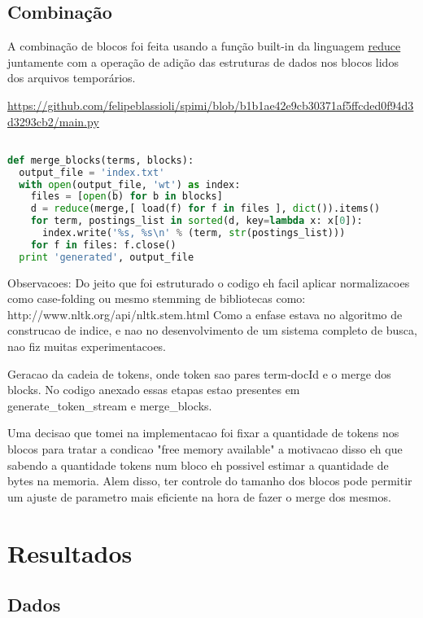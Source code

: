 \documentclass[a4paper]{article}
\begin{document}
\subsection{Combinação}

A combinação de blocos foi feita usando a função built-in da linguagem \href{https://docs.python.org/2/library/functions.html#reduce}{reduce} juntamente com a operação de adição das estruturas de dados nos blocos lidos dos arquivos temporários.

\url{https://github.com/felipeblassioli/spimi/blob/b1b1ae42e9cb30371af5ffcded0f94d3d3293cb2/main.py}
\begin{lstlisting}[language=Python]  % Start your code-block

def merge_blocks(terms, blocks):
  output_file = 'index.txt'
  with open(output_file, 'wt') as index:
    files = [open(b) for b in blocks]
    d = reduce(merge,[ load(f) for f in files ], dict()).items()
    for term, postings_list in sorted(d, key=lambda x: x[0]):
      index.write('%s, %s\n' % (term, str(postings_list)))
    for f in files: f.close()
  print 'generated', output_file
\end{lstlisting}

Observacoes:
Do jeito que foi estruturado o codigo eh facil aplicar normalizacoes como case-folding ou mesmo stemming de bibliotecas como: http://www.nltk.org/api/nltk.stem.html
Como a enfase estava no algoritmo de construcao de indice, e nao no desenvolvimento de um sistema completo de busca, nao fiz muitas experimentacoes.

Geracao da cadeia de tokens, onde token sao pares term-docId e o merge dos blocks. No codigo anexado 
essas etapas estao presentes em generate_token_stream e merge_blocks.

Uma decisao que tomei na implementacao foi fixar a quantidade de tokens nos blocos para tratar a condicao "free memory available"
a motivacao disso eh que sabendo a quantidade tokens num bloco eh possivel estimar a quantidade de bytes na memoria.
Alem disso, ter controle do tamanho dos blocos pode permitir um ajuste de parametro mais eficiente na hora de fazer o merge dos mesmos.

\section{Resultados}
\subsection{Dados}
\end{document}
